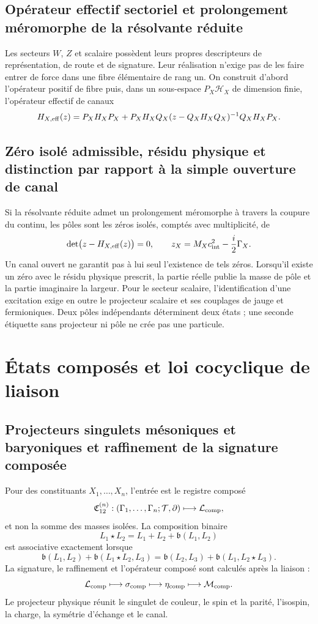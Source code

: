 \subsection{Opérateur effectif sectoriel et prolongement méromorphe de la résolvante réduite}

Les secteurs \(W\), \(Z\) et scalaire possèdent leurs propres descripteurs de
représentation, de route et de signature. Leur réalisation n'exige pas de les faire entrer de force dans une
fibre élémentaire de rang un. On construit d'abord l'opérateur positif de
fibre puis, dans un sous-espace \(P_X\mathcal H_X\) de dimension finie,
l'opérateur effectif de canaux
\[
 H_{X,\rm eff}(z)
 =P_X H_X P_X
 +P_X H_X Q_X(z-Q_X H_X Q_X)^{-1}Q_X H_X P_X.
\]
\subsection{Zéro isolé admissible, résidu physique et distinction par rapport à la simple ouverture de canal}

Si la résolvante réduite admet un prolongement méromorphe à travers la coupure du
continu, les pôles sont les zéros isolés, comptés avec multiplicité, de
\[
 \det\bigl(z-H_{X,\rm eff}(z)\bigr)=0,
 \qquad
 z_X=M_X c_{\rm int}^2-\frac{i}{2}\Gamma_X.
\]
Un canal ouvert ne garantit pas à lui seul l'existence de tels zéros. Lorsqu'il
existe un zéro avec le résidu physique prescrit, la partie réelle publie la masse de
pôle et la partie imaginaire la largeur. Pour le
secteur scalaire, l'identification d'une excitation exige en outre le projecteur
scalaire et ses couplages de jauge et fermioniques. Deux pôles indépendants
déterminent deux états ; une seconde étiquette sans projecteur ni pôle ne crée pas une
particule.

\section{États composés et loi cocyclique de liaison}

\subsection{Projecteurs singulets mésoniques et baryoniques et raffinement de la signature composée}

Pour des constituants \(X_1,\ldots,X_n\), l'entrée est le registre composé
\[
 \mathfrak C_{12}^{(n)}:
 (\Gamma_1,\ldots,\Gamma_n;\mathcal T,\partial)
 \longmapsto\mathcal L_{\rm comp},
\]
et non la somme des masses isolées. La composition binaire
\[
 L_1\star L_2=L_1+L_2+\mathfrak b(L_1,L_2)
\]
est associative exactement lorsque
\[
 \mathfrak b(L_1,L_2)+\mathfrak b(L_1\star L_2,L_3)
 =\mathfrak b(L_2,L_3)+\mathfrak b(L_1,L_2\star L_3).
\]
La signature, le raffinement et l'opérateur composé sont calculés après la
liaison :
\[
 \mathcal L_{\rm comp}\longmapsto\sigma_{\rm comp}
 \longmapsto\eta_{\rm comp}\longmapsto\mathcal M_{\rm comp}.
\]
Le projecteur physique réunit le singulet de couleur, le spin et la parité, l'isospin, la charge, la symétrie d'échange et le canal.

